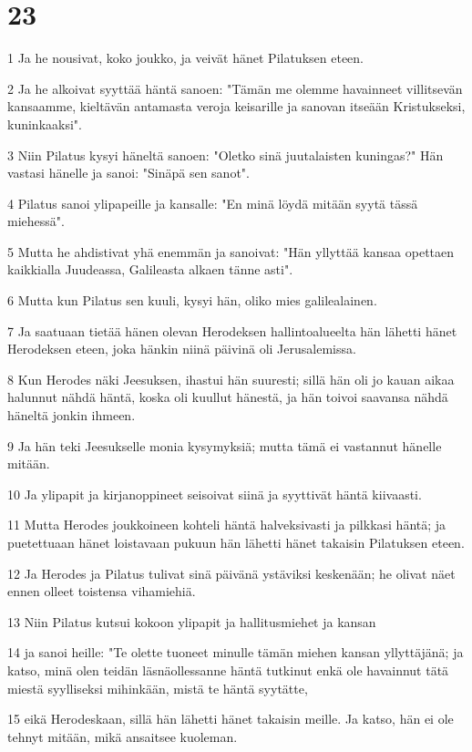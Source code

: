 \chapter{23}

\par 1 Ja he nousivat, koko joukko, ja veivät hänet Pilatuksen eteen.
\par 2 Ja he alkoivat syyttää häntä sanoen: "Tämän me olemme havainneet villitsevän kansaamme, kieltävän antamasta veroja keisarille ja sanovan itseään Kristukseksi, kuninkaaksi".
\par 3 Niin Pilatus kysyi häneltä sanoen: "Oletko sinä juutalaisten kuningas?" Hän vastasi hänelle ja sanoi: "Sinäpä sen sanot".
\par 4 Pilatus sanoi ylipapeille ja kansalle: "En minä löydä mitään syytä tässä miehessä".
\par 5 Mutta he ahdistivat yhä enemmän ja sanoivat: "Hän yllyttää kansaa opettaen kaikkialla Juudeassa, Galileasta alkaen tänne asti".
\par 6 Mutta kun Pilatus sen kuuli, kysyi hän, oliko mies galilealainen.
\par 7 Ja saatuaan tietää hänen olevan Herodeksen hallintoalueelta hän lähetti hänet Herodeksen eteen, joka hänkin niinä päivinä oli Jerusalemissa.
\par 8 Kun Herodes näki Jeesuksen, ihastui hän suuresti; sillä hän oli jo kauan aikaa halunnut nähdä häntä, koska oli kuullut hänestä, ja hän toivoi saavansa nähdä häneltä jonkin ihmeen.
\par 9 Ja hän teki Jeesukselle monia kysymyksiä; mutta tämä ei vastannut hänelle mitään.
\par 10 Ja ylipapit ja kirjanoppineet seisoivat siinä ja syyttivät häntä kiivaasti.
\par 11 Mutta Herodes joukkoineen kohteli häntä halveksivasti ja pilkkasi häntä; ja puetettuaan hänet loistavaan pukuun hän lähetti hänet takaisin Pilatuksen eteen.
\par 12 Ja Herodes ja Pilatus tulivat sinä päivänä ystäviksi keskenään; he olivat näet ennen olleet toistensa vihamiehiä.
\par 13 Niin Pilatus kutsui kokoon ylipapit ja hallitusmiehet ja kansan
\par 14 ja sanoi heille: "Te olette tuoneet minulle tämän miehen kansan yllyttäjänä; ja katso, minä olen teidän läsnäollessanne häntä tutkinut enkä ole havainnut tätä miestä syylliseksi mihinkään, mistä te häntä syytätte,
\par 15 eikä Herodeskaan, sillä hän lähetti hänet takaisin meille. Ja katso, hän ei ole tehnyt mitään, mikä ansaitsee kuoleman.
